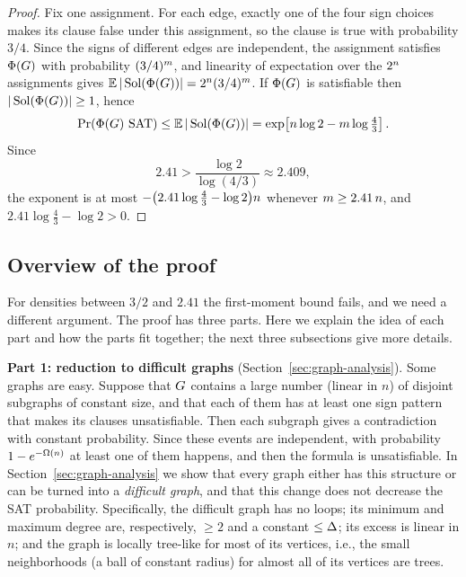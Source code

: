 \begin{proof}
Fix one assignment. For each edge, exactly one of the four sign choices makes
its clause false under this assignment, so the clause is true with probability
\(3/4\). Since the signs of different edges are independent, the assignment
satisfies \(\Phi(G)\) with probability \((3/4)^{m}\), and linearity of
expectation over the \(2^{n}\) assignments gives
\(\mathbb{E}\,|\operatorname{Sol}(\Phi(G))|=2^{n}(3/4)^{m}\). If \(\Phi(G)\) is
satisfiable then \(|\operatorname{Sol}(\Phi(G))|\ge1\), hence
\[
  \Prx{\rform{\Gin}\SAT}\le\E\,|\Sol(\rform{\Gin})|
  =\exp\!\left[\nvert\log2-\medge\log\tfrac43\right].
\]
Since
\[
  2.41>\frac{\log2}{\log(4/3)}\approx2.409 ,
\]
the exponent is at most
\(-\bigl(2.41\log\tfrac43-\log2\bigr)n\) whenever
\(m\ge2.41\,n\), and \(2.41\log\tfrac43-\log2>0\).
\end{proof}

\subsection{Overview of the proof}\label{subsec:overview-proof}

For densities between \(3/2\) and \(2.41\) the first-moment bound fails, and we
need a different argument. The proof has three parts. Here we explain the idea
of each part and how the parts fit together; the next three subsections give
more details.

\medskip
\noindent\textbf{Part 1: reduction to difficult graphs}
(Section~\ref{sec:graph-analysis}). Some graphs are easy. Suppose that
\(G\) contains a large number (linear in $n$) of disjoint subgraphs of constant size, and that
each of them has at least one sign pattern that makes its clauses
unsatisfiable. Then each subgraph gives a contradiction with constant probability. 
Since these events are independent, with probability
\(1-e^{-\Omega(n)}\) at least one of them happens, and then the formula is
unsatisfiable. In Section~\ref{sec:graph-analysis} we show that every graph
either has this structure or can be turned into a \emph{difficult graph}, and
that this change does not decrease the SAT probability. Specifically, the difficult
graph has no loops; its minimum and maximum degree are, respectively, \(\ge 2\) and a constant
\(\le \Delta\); its excess is linear in $n$; and the graph is locally tree-like for most of its vertices, i.e., the small neighborhoods (a ball of constant radius) for almost all of its vertices are trees.

